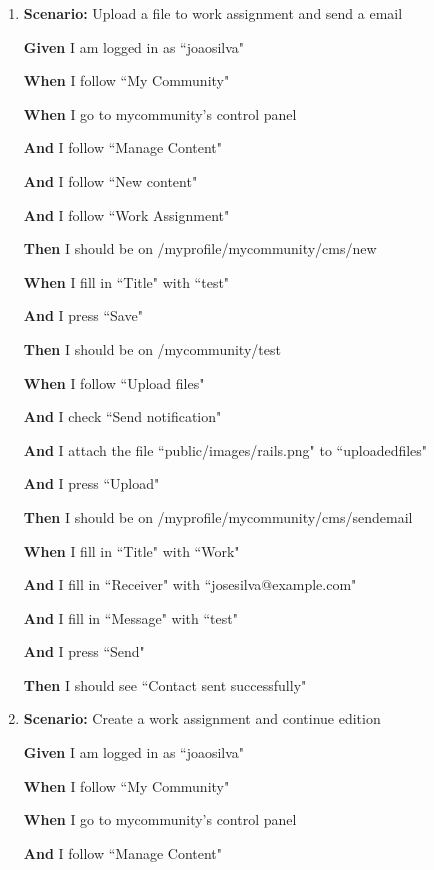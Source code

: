 \begin{enumerate}
\item  \textbf{Scenario:} Upload a file to work assignment and send a email
    
    \textbf{Given} I am logged in as ``joaosilva" 
    
    \textbf{When} I follow ``My Community"
    
    \textbf{When} I go to mycommunity's control panel
    
    \textbf{And} I follow ``Manage Content"
    
    \textbf{And} I follow ``New content"
    
    \textbf{And} I follow ``Work Assignment"
    
    \textbf{Then} I should be on /myprofile/mycommunity/cms/new
    
    \textbf{When} I fill in ``Title" with ``test"
    
    \textbf{And} I press ``Save"
    
    \textbf{Then} I should be on /mycommunity/test
    
    \textbf{When} I follow ``Upload files"
    
    \textbf{And} I check ``Send notification"
    
    \textbf{And} I attach the file ``public/images/rails.png" to ``uploadedfiles"
    
    \textbf{And} I press ``Upload"
    
    \textbf{Then} I should be on /myprofile/mycommunity/cms/sendemail
    
    \textbf{When} I fill in ``Title" with ``Work"
    
    \textbf{And} I fill in ``Receiver" with ``josesilva@example.com"
    
    \textbf{And} I fill in ``Message" with ``test"
    
    \textbf{And} I press ``Send"
    
    \textbf{Then} I should see ``Contact sent successfully"

\item \textbf{Scenario:} Create a work assignment and continue edition

    \textbf{Given} I am logged in as ``joaosilva" 
    
    \textbf{When} I follow ``My Community"
    
    \textbf{When} I go to mycommunity's control panel
    
    \textbf{And} I follow ``Manage Content"
    

\end{enumerate}
